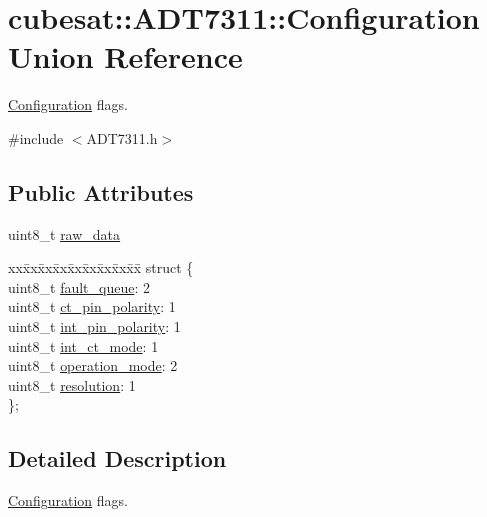 \hypertarget{unioncubesat_1_1ADT7311_1_1Configuration}{}\section{cubesat\+:\+:A\+D\+T7311\+:\+:Configuration Union Reference}
\label{unioncubesat_1_1ADT7311_1_1Configuration}


\hyperlink{unioncubesat_1_1ADT7311_1_1Configuration}{Configuration} flags.  




{\ttfamily \#include $<$A\+D\+T7311.\+h$>$}

\subsection*{Public Attributes}
\begin{DoxyCompactItemize}
\item 
uint8\+\_\+t \hyperlink{unioncubesat_1_1ADT7311_1_1Configuration_a4f6ac27286d83a2939d6c4fbc78d27e0}{raw\+\_\+data}
\item 
\begin{tabbing}
xx\=xx\=xx\=xx\=xx\=xx\=xx\=xx\=xx\=\kill
struct \{\\
\>uint8\_t \hyperlink{unioncubesat_1_1ADT7311_1_1Configuration_ad7b39750de3e965bf6502713f30e5dab}{fault\_queue}: 2\\
\>uint8\_t \hyperlink{unioncubesat_1_1ADT7311_1_1Configuration_a0f4c938f5789778b0e874df96f438303}{ct\_pin\_polarity}: 1\\
\>uint8\_t \hyperlink{unioncubesat_1_1ADT7311_1_1Configuration_aaab5bfe3db6f136c461629c0e8fb9aa3}{int\_pin\_polarity}: 1\\
\>uint8\_t \hyperlink{unioncubesat_1_1ADT7311_1_1Configuration_a3f5b4523c359277cd63a02f97664cbfc}{int\_ct\_mode}: 1\\
\>uint8\_t \hyperlink{unioncubesat_1_1ADT7311_1_1Configuration_a5e41dfda654cd1b6937c36057d689f1a}{operation\_mode}: 2\\
\>uint8\_t \hyperlink{unioncubesat_1_1ADT7311_1_1Configuration_a9a2f180d08ac0b67adadd3e8a7f134e8}{resolution}: 1\\
\}; \\

\end{tabbing}\end{DoxyCompactItemize}


\subsection{Detailed Description}
\hyperlink{unioncubesat_1_1ADT7311_1_1Configuration}{Configuration} flags. 

